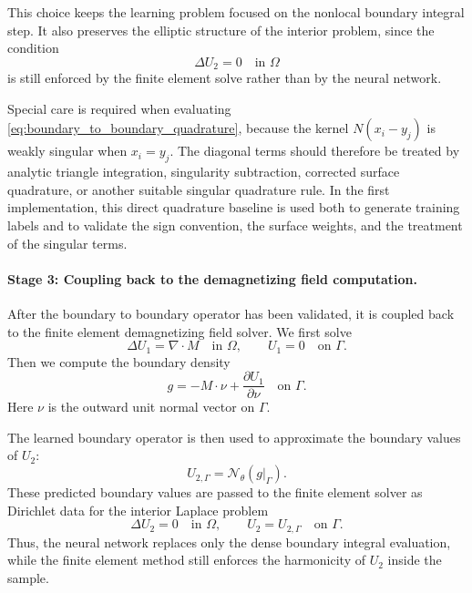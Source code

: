 \documentclass[11pt]{article}
\numberwithin{equation}{section}
\begin{document}
This choice keeps the learning problem focused on the nonlocal boundary integral step. It also preserves the elliptic structure of the interior problem, since the condition
\begin{equation}
    \Delta U_2 = 0
    \quad \text{in } \Omega
\end{equation}
is still enforced by the finite element solve rather than by the neural network.

Special care is required when evaluating \eqref{eq:boundary_to_boundary_quadrature}, because the kernel \(N(x_i-y_j)\) is weakly singular when \(x_i=y_j\). The diagonal terms should therefore be treated by analytic triangle integration, singularity subtraction, corrected surface quadrature, or another suitable singular quadrature rule. In the first implementation, this direct quadrature baseline is used both to generate training labels and to validate the sign convention, the surface weights, and the treatment of the singular terms.

\paragraph{Stage 3: Coupling back to the demagnetizing field computation.}
After the boundary to boundary operator has been validated, it is coupled back to the finite element demagnetizing field solver. We first solve
\begin{equation}
    \Delta U_1 = \nabla\cdot M
    \quad \text{in } \Omega,
    \qquad
    U_1 = 0
    \quad \text{on } \Gamma.
    \label{eq:u1_problem}
\end{equation}
Then we compute the boundary density
\begin{equation}
    g
    =
    -M\cdot\nu
    +
    \frac{\partial U_1}{\partial \nu}
    \quad \text{on } \Gamma.
    \label{eq:boundary_density_g}
\end{equation}
Here \(\nu\) is the outward unit normal vector on \(\Gamma\).

The learned boundary operator is then used to approximate the boundary values of \(U_2\):
\begin{equation}
    U_{2,\Gamma}
    =
    \mathcal{N}_\theta(g|_{\Gamma}).
    \label{eq:learned_u2_boundary_values}
\end{equation}
These predicted boundary values are passed to the finite element solver as Dirichlet data for the interior Laplace problem
\begin{equation}
    \Delta U_2 = 0
    \quad \text{in } \Omega,
    \qquad
    U_2 = U_{2,\Gamma}
    \quad \text{on } \Gamma.
    \label{eq:u2_harmonic_extension}
\end{equation}
Thus, the neural network replaces only the dense boundary integral evaluation, while the finite element method still enforces the harmonicity of \(U_2\) inside the sample.
\end{document}
